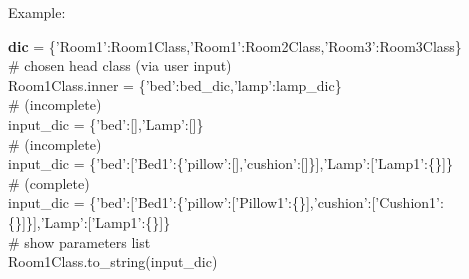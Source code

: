 \begin{landscape}
\begin{figure}
	\end{figure}
\end{landscape}

Example:
{\small
\begin{flushleft}
	\textbf{dic} = \{'Room1':Room1Class,'Room1':Room2Class,'Room3':Room3Class\}
	\\
	\# chosen head class (via user input)
	\\
	Room1Class.inner = \{'bed':bed\_dic,'lamp':lamp\_dic\}
	\\
	\# (incomplete)
	\\
	input\_dic = \{'bed':[],'Lamp':[]\}
	\\
	\# (incomplete)
	\\
	input\_dic = \{'bed':['Bed1':\{'pillow':[],'cushion':[]\}],'Lamp':['Lamp1':\{\}]\}	
	\\
	\# (complete) 
	\\
	input\_dic = \{'bed':['Bed1':\{'pillow':['Pillow1':\{\}],'cushion':['Cushion1':\{\}]\}],'Lamp':['Lamp1':\{\}]\}
	\\
	\# show parameters list
	\\
	Room1Class.to\_string(input\_dic)
\end{flushleft}
}